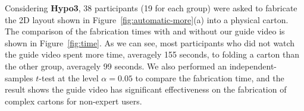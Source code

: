 
Considering \textbf{Hypo3}, 38 participants (19 for each group) were asked to fabricate the 2D layout shown in Figure~\ref{fig:automatic-more}(a) into a physical carton. 
The comparison of the fabrication times with and without our guide video is shown in Figure~\ref{fig:time}. 
As we can see, most participants who did not watch the guide video spent more time, averagely 155 seconds, to folding a carton than the other group, averagely 99 seconds.
% 
%
We also performed an independent-samples $t$-test at the level $\alpha = 0.05$ to compare the fabrication time, and the result shows the guide video has significant effectiveness on the fabrication of complex cartons for non-expert users.




